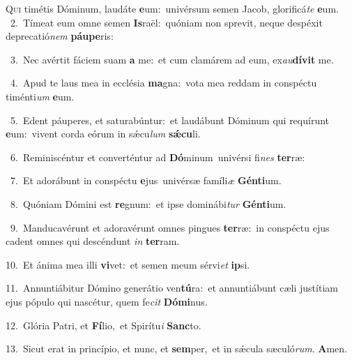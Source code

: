 \lettrine{\initial\textcolor{\initialcolor}{Q}}{ui} timétis Dóminum, laudáte \textbf{e}\-um:~\star univérsum semen Jacob, glorificá\textit{te} \textbf{e}\-um.\\
{\numbfont\textcolor{\numbcolor}{~2.}}~Tímeat eum omne semen \textbf{Is}\-raël:~\star quóniam non sprevit, neque despéxit deprecatió\textit{nem} \textbf{páu}\-\textbf{pe}ris:\par
{\numbfont\textcolor{\numbcolor}{~3.}}~Nec avértit fáciem suam \textbf{a} me:~\star et cum clamárem ad eum, ex\-\textit{au}\-\textbf{dí}\textbf{vit} me.\par
{\numbfont\textcolor{\numbcolor}{~4.}}~Apud te laus mea in ecclésia \textbf{ma}\-gna:~\star vota mea reddam in conspéctu timénti\textit{um} \textbf{e}\-um.\par
{\numbfont\textcolor{\numbcolor}{~5.}}~Edent páuperes, et saturabúntur:~\dagger et laudábunt Dóminum qui requírunt \textbf{e}\-um:~\star vivent corda eórum in sǽcu\textit{lum} \textbf{sǽ}\-\textbf{cu}li.\par
{\numbfont\textcolor{\numbcolor}{~6.}}~Reminiscéntur et converténtur ad \textbf{Dó}\-minum~\star univérsi fi\textit{nes} \textbf{ter}\-ræ:\par
{\numbfont\textcolor{\numbcolor}{~7.}}~Et adorábunt in conspéctu \textbf{e}\-jus~\star univérsæ famíli\textit{æ} \textbf{Gén}\-\textbf{ti}um.\par
{\numbfont\textcolor{\numbcolor}{~8.}}~Quóniam Dómini est \textbf{re}\-gnum:~\star et ipse dominábi\textit{tur} \textbf{Gén}\-\textbf{ti}um.\par
{\numbfont\textcolor{\numbcolor}{~9.}}~Manducavérunt et adoravérunt omnes pingues \textbf{ter}\-ræ:~\star in conspéctu ejus cadent omnes qui descéndunt \textit{in} \textbf{ter}\-ram.\par
{\numbfont\textcolor{\numbcolor}{10.}}~Et ánima mea illi \textbf{vi}\-vet:~\star et semen meum sérvi\textit{et} \textbf{ip}\-si.\par
{\numbfont\textcolor{\numbcolor}{11.}}~Annuntiábitur Dómino generátio ven\-\textbf{tú}\-ra:~\star et annuntiábunt cæli justítiam ejus pópulo qui nascétur, quem fe\textit{cit} \textbf{Dó}\-\textbf{mi}nus.\par
{\numbfont\textcolor{\numbcolor}{12.}}~Glória Patri, et \textbf{Fí}\-lio,~\star et Spirítu\textit{i} \textbf{Sanc}\-to.\par
{\numbfont\textcolor{\numbcolor}{13.}}~Sicut erat in princípio, et nunc, et \textbf{sem}\-per,~\star et in sǽcula sæculó\-\textit{rum}\-. \textbf{A}\-men.\par

